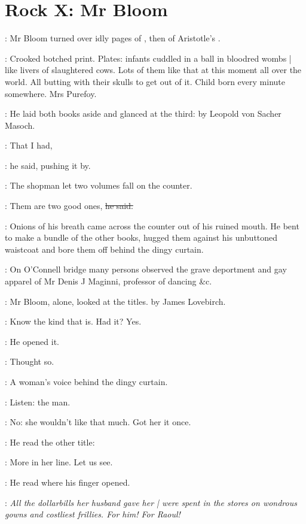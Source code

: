 \section*{Rock X: Mr Bloom}


:
Mr Bloom turned over idly pages of
,
then of Aristotle's .

\BloomInt:
Crooked botched print.
Plates:
infants cuddled in a ball in bloodred wombs |
like livers of slaughtered cows.
Lots of them like that at this moment all over the world.
All butting with their skulls to get out of it.
Child born every minute somewhere.
Mrs Purefoy.%

:
He laid both books aside and glanced at the third:
by Leopold von Sacher Masoch.

\Bloom:
That I had,

:
he said,
pushing it by.

:
The shopman let two volumes fall on the counter.

\shopman:
Them are two good ones,
\sout{he said.}

:
Onions of his breath came across the counter
out of his ruined mouth.
He bent to make a bundle of the other books,
hugged them against his unbuttoned waistcoat
and bore them off behind the dingy curtain.

:
On O'Connell bridge
many persons observed the grave deportment
and gay apparel of Mr Denis J Maginni,
professor of dancing \&c.

:
Mr Bloom, alone,
looked at the titles.
 by James Lovebirch.

\BloomInt:
Know the kind that is.
Had it?
Yes.

:
He opened it.

\BloomInt:
Thought so.

:
A woman's voice behind the dingy curtain.

\BloomInt:
Listen: the man.

\BloomInt:
No:
she wouldn't like that much.
Got her it once.

:
He read the other title:

\BloomInt:
More in her line.
Let us see.

:
He read where his finger opened.

\BloomInt:
\emph{All the dollarbills her husband gave her |
were spent in the stores
on wondrous gowns and costliest frillies.
For him!
For Raoul!}

